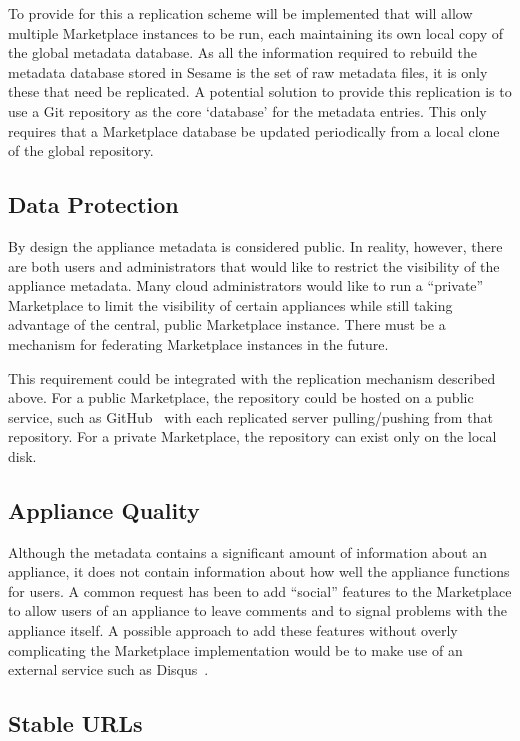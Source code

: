 To provide for this a replication scheme will be implemented that will 
allow multiple Marketplace instances to be run, each maintaining its own 
local copy of the global metadata database. As all the information required 
to rebuild the metadata database stored in Sesame is the set of raw metadata 
files, it is only these that need be replicated.  A potential solution to provide this
replication is to use a Git repository as the core `database' for the
metadata entries. This only requires that a Marketplace database be
updated periodically from a local clone of the global repository.

\subsection{Data Protection}

By design the appliance metadata is considered public.  In reality,
however, there are both users and administrators that would like to
restrict the visibility of the appliance metadata.  Many cloud
administrators would like to run a ``private'' Marketplace to limit
the visibility of certain appliances while still taking advantage of
the central, public Marketplace instance.  There must be a mechanism
for federating Marketplace instances in the future. 

This requirement could be integrated with the replication mechanism described above.  
For a public Marketplace, the repository could be hosted on a public service, 
such as GitHub~\cite{github} with each replicated server pulling/pushing 
from that repository.  For a private Marketplace, the repository can exist 
only on the local disk.

\subsection{Appliance Quality}

Although the metadata contains a significant amount of information
about an appliance, it does not contain information about how well the
appliance functions for users.  A common request has been to add
``social'' features to the Marketplace to allow users of an appliance
to leave comments and to signal problems with the appliance itself.  
A possible approach to add these features without overly complicating 
the Marketplace implementation would be to make use of an external service 
such as Disqus~\cite{disqus}.

\subsection{Stable URLs}

